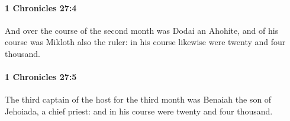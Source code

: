 		\paragraph{1 Chronicles 27:4} %
			\label{1CHRONICLES-27-4}

			And over the course of the second month was Dodai an Ahohite, and of his course was Mikloth also the ruler: in his course likewise were twenty and four thousand.


		\paragraph{1 Chronicles 27:5} %
			\label{1CHRONICLES-27-5}

			The third captain of the host for the third month was Benaiah the son of Jehoiada, a chief priest: and in his course were twenty and four thousand.


